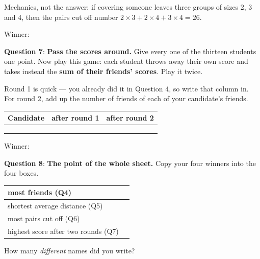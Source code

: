\documentclass[a4paper, 14pt]{extarticle}
\begin{document}
{\footnotesize Mechanics, not the answer: if covering someone leaves three
groups of sizes 2, 3 and 4, then the pairs cut off number
$2\times3 + 2\times4 + 3\times4 = 26$.}

Winner: \underline{\hspace{5cm}}

\clearpage

{\bf Question 7}: {\bf Pass the scores around.} Give every one of the thirteen
students one point. Now play this game: each student throws away their own
score and takes instead the {\bf sum of their friends' scores}. Play it twice.

Round 1 is quick --- you already did it in Question 4, so write that column in.
For round 2, add up the number of friends of each of your candidate's friends.

\begin{center}
{\setlength{\tabcolsep}{6pt}
\begin{tabular}{|p{3.4cm}|p{3.2cm}|p{6cm}|}
\hline
\textbf{Candidate} & \textbf{after round 1} & \textbf{after round 2} \\
\hline
 & & \\[0.9cm] \hline
 & & \\[0.9cm] \hline
 & & \\[0.9cm] \hline
\end{tabular}}
\end{center}

Winner: \underline{\hspace{5cm}}

\vspace{1.5em}

{\bf Question 8}: {\bf The point of the whole sheet.} Copy your four winners
into the four boxes.

\begin{center}
{\setlength{\tabcolsep}{5pt}
\begin{tabular}{|p{6.5cm}|p{6cm}|}
\hline
most friends (Q4) & \\[0.6cm] \hline
shortest average distance (Q5) & \\[0.6cm] \hline
most pairs cut off (Q6) & \\[0.6cm] \hline
highest score after two rounds (Q7) & \\[0.6cm] \hline
\end{tabular}}
\end{center}

How many \emph{different} names did you write?
\underline{\hspace{2cm}}
\end{document}
